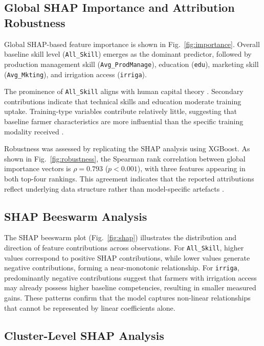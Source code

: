 \documentclass[3p,twocolumn,authoryear]{elsarticle}
\begin{document}
\subsection{Global SHAP Importance and Attribution Robustness}

Global SHAP-based feature importance is shown in
Fig.~\ref{fig:importance}.
Overall baseline skill level (\texttt{All\_Skill}) emerges as the
dominant predictor, followed by production management skill
(\texttt{Avg\_ProdManage}), education (\texttt{edu}), marketing skill
(\texttt{Avg\_Mkting}), and irrigation access (\texttt{irriga}).

The prominence of \texttt{All\_Skill} aligns with human capital theory
\citep{feder1985}.
Secondary contributions indicate that technical skills and education
moderate training uptake.
Training-type variables contribute relatively little, suggesting that
baseline farmer characteristics are more influential than the specific
training modality received \citep{ryo2022}.

Robustness was assessed by replicating the SHAP analysis using XGBoost.
As shown in Fig.~\ref{fig:robustness}, the Spearman rank correlation
between global importance vectors is $\rho = 0.793$ ($p < 0.001$), with
three features appearing in both top-four rankings.
This agreement indicates that the reported attributions reflect
underlying data structure rather than model-specific artefacts
\citep{lundberg2020}.

\subsection{SHAP Beeswarm Analysis}

The SHAP beeswarm plot (Fig.~\ref{fig:shap}) illustrates the distribution
and direction of feature contributions across observations.
For \texttt{All\_Skill}, higher values correspond to positive SHAP
contributions, while lower values generate negative contributions,
forming a near-monotonic relationship.
For \texttt{irriga}, predominantly negative contributions suggest that
farmers with irrigation access may already possess higher baseline
competencies, resulting in smaller measured gains.
These patterns confirm that the model captures non-linear relationships
that cannot be represented by linear coefficients alone.

\subsection{Cluster-Level SHAP Analysis}
\end{document}
